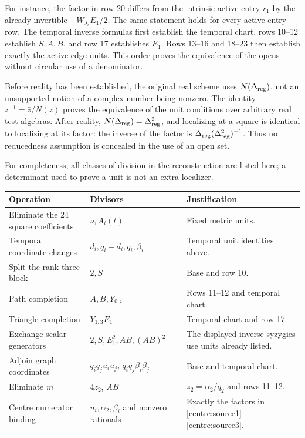 \documentclass[11pt,a4paper]{article}
\theoremstyle{remark}\newtheorem{remark}[theorem]{Remark}
\begin{document}
For instance, the factor in row 20 differs from the intrinsic active
entry $r_1$ by the already invertible $-W_{J_r}E_1/2$.
The same statement holds for every active-entry row. The temporal
inverse formulas first establish the temporal chart, rows 10--12
establish $S,A,B$, and row 17 establishes $E_1$. Rows 13--16 and
18--23 then establish exactly the active-edge units. This order proves
the equivalence of the opens without circular use of a denominator.

Before reality has been established, the original real scheme uses
$N(\Delta_{\rm reg})$, not an unsupported notion of a complex number
being nonzero. The identity
$z^{-1}=\bar z/N(z)$ proves the equivalence of the unit conditions
over arbitrary real test algebras. After reality,
$N(\Delta_{\rm reg})=\Delta_{\rm reg}^2$, and localizing at a square
is identical to localizing at its factor: the inverse of the factor is
$\Delta_{\rm reg}(\Delta_{\rm reg}^2)^{-1}$. Thus no reducedness
assumption is concealed in the use of an open set.

For completeness, all classes of division in the reconstruction are
listed here; a determinant used to prove a unit is not an extra
localizer.

\begin{center}\small
\begin{tabular}{p{.30\linewidth}p{.28\linewidth}p{.33\linewidth}}
\hline
Operation&Divisors&Justification\\\hline
Eliminate the $24$ square coefficients&$\nu,A_i(t)$&Fixed metric units.\\
Temporal coordinate changes&$d_i,q_i-d_i,q_i,\beta_i$&Temporal unit identities above.\\
Split the rank-three block&$2,S$&Base and row 10.\\
Path completion&$A,B,Y_{0,i}$&Rows 11--12 and temporal chart.\\
Triangle completion&$Y_{1,3}E_1$&Temporal chart and row 17.\\
Exchange scalar generators&$2,S,E_1^2,AB,(AB)^2$&The displayed inverse syzygies use units already listed.\\
Adjoin graph coordinates&$q_iq_ju_iu_j$, $q_iq_j\beta_i\beta_j$&Base and temporal chart.\\
Eliminate $m$&$4z_2$, $AB$&$z_2=\alpha_2/q_2$ and rows 11--12.\\
Centre numerator binding&$u_i,\alpha_2,\beta_i$ and nonzero rationals&Exactly the factors in \eqref{centre:source1}--\eqref{centre:source3}.\\\hline
\end{tabular}
\end{center}
\end{document}
